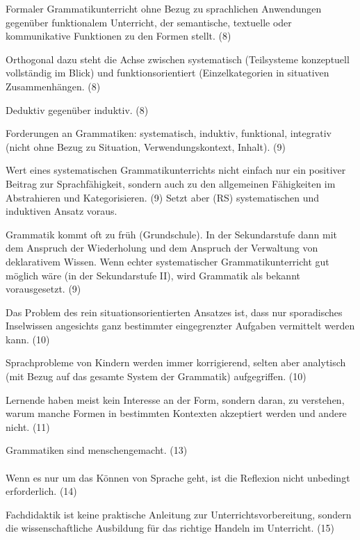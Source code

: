 Formaler Grammatikunterricht ohne Bezug zu sprachlichen Anwendungen gegenüber funktionalem Unterricht, der semantische, textuelle oder kommunikative Funktionen zu den Formen stellt. (8)

Orthogonal dazu steht die Achse zwischen systematisch (Teilsysteme konzeptuell vollständig im Blick) und funktionsorientiert (Einzelkategorien in situativen Zusammenhängen. (8)

Deduktiv gegenüber induktiv. (8)

Forderungen an Grammatiken: systematisch, induktiv, funktional, integrativ (nicht ohne Bezug zu Situation, Verwendungskontext, Inhalt). (9)

Wert eines systematischen Grammatikunterrichts nicht einfach nur ein positiver Beitrag zur Sprachfähigkeit, sondern auch zu den allgemeinen Fähigkeiten im Abstrahieren und Kategorisieren. (9) Setzt aber (RS) systematischen und induktiven Ansatz voraus.

Grammatik kommt oft zu früh (Grundschule).
In der Sekundarstufe dann mit dem Anspruch der Wiederholung und dem Anspruch der Verwaltung von deklarativem Wissen.
Wenn echter systematischer Grammatikunterricht gut möglich wäre (in der Sekundarstufe II), wird Grammatik als bekannt vorausgesetzt. (9)

Das Problem des rein situationsorientierten Ansatzes ist, dass nur sporadisches Inselwissen angesichts ganz bestimmter eingegrenzter Aufgaben vermittelt werden kann. (10)

Sprachprobleme von Kindern werden immer korrigierend, selten aber analytisch (mit Bezug auf das gesamte System der Grammatik) aufgegriffen. (10)

Lernende haben meist kein Interesse an der Form, sondern daran, zu verstehen, warum manche Formen in bestimmten Kontexten akzeptiert werden und andere nicht. (11)

Grammatiken sind menschengemacht. (13)



\paragraph{\citet{Bredel2013}}

Wenn es nur um das Können von Sprache geht, ist die Reflexion nicht unbedingt erforderlich. (14)

Fachdidaktik ist keine praktische Anleitung zur Unterrichtsvorbereitung, sondern die wissenschaftliche Ausbildung für das richtige Handeln im Unterricht. (15)

